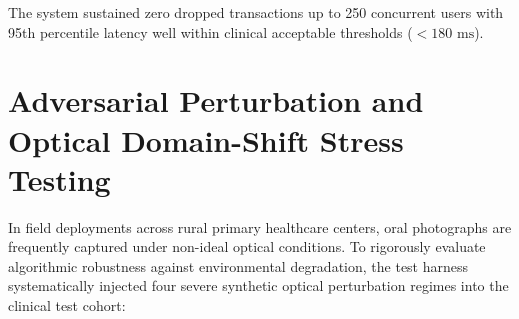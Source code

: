 \documentclass[12pt,a4paper,oneside]{report}
\begin{document}
The system sustained zero dropped transactions up to 250 concurrent users with 95th percentile latency well within clinical acceptable thresholds ($< 180\text{ ms}$).

\section{Adversarial Perturbation and Optical Domain-Shift Stress Testing}
\label{sec:adversarial_testing}

In field deployments across rural primary healthcare centers, oral photographs are frequently captured under non-ideal optical conditions. To rigorously evaluate algorithmic robustness against environmental degradation, the test harness systematically injected four severe synthetic optical perturbation regimes into the clinical test cohort:
\end{document}
